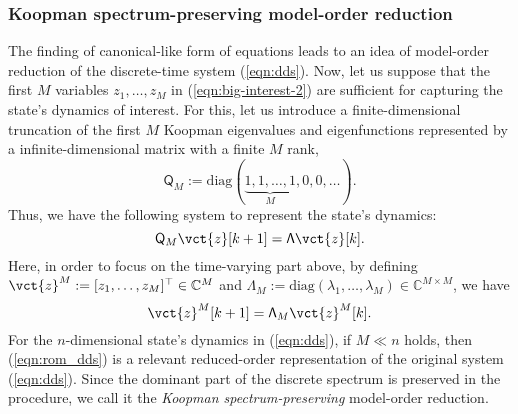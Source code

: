 \documentclass[a4paper,10pt]{article}
\def\bbC{{\mathbb{C}}}
\begin{document}
\subsubsection{Koopman spectrum-preserving model-order reduction}
\label{subsec:MOR-2}

The finding of canonical-like form of equations leads to an idea of model-order reduction of the discrete-time system (\ref{eqn:dds}).  
Now, let us suppose that the first $M$ variables $z_1,\ldots,z_M$ in (\ref{eqn:big-interest-2}) are sufficient for capturing the state's dynamics of interest.  
For this, let us introduce a finite-dimensional truncation of the first $M$ Koopman eigenvalues and eigenfunctions represented by a infinite-dimensional matrix with a finite $M$ rank,
\[
\mathsf{Q}_M:=\mathrm{diag}(\underbrace{1,1,\ldots,1}_{M},0,0,\ldots).
\]  
Thus, we have {\color{black}the following system to represent the state's dynamics:
\[
\mathsf{Q}_M\vct{z}[k+1]=\mathsf{\Lambda}\vct{z}[k].
\]
Here, in order to focus on the time-varying part above, by defining $\vct{z}^M:=[z_1,\ldots,z_M]^\top\in\bbC^M$ and $\mathsf{\Lambda}_M:=\mathrm{diag}(\lambda_1,\ldots,\lambda_M)\in\bbC^{M\times M}$, we have
\begin{equation}
\vct{z}^M[k+1]=\mathsf{\Lambda}_M\vct{z}^M[k].
\label{eqn:rom_dds}
\end{equation}
}For the $n$-dimensional state's dynamics in (\ref{eqn:dds}), if $M\ll n$ holds, then (\ref{eqn:rom_dds}) is a relevant reduced-order representation of the original system (\ref{eqn:dds}).  
Since the dominant part of the discrete spectrum is preserved in the procedure, we call it the \emph{Koopman spectrum-preserving} model-order reduction.
\end{document}
